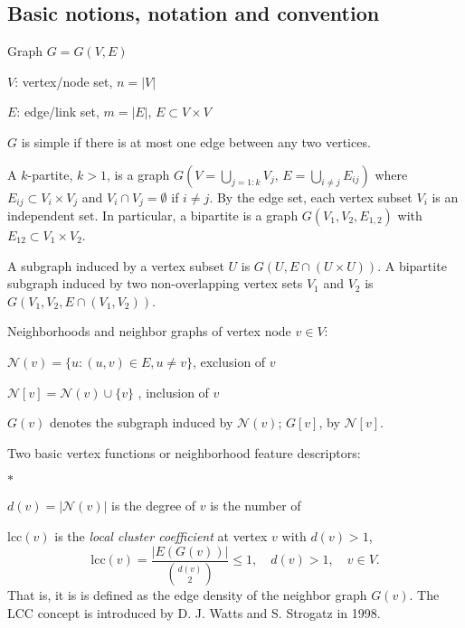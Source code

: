 %





\subsection*{Basic notions, notation and convention}

\noindent
Graph $G = G(V,E)$ 
\begin{list}{}{} 
\item $V$: vertex/node set, $n=|V|$ 
\item $E$: edge/link set, $m=|E|$, $E\subset V\times V$
\item $G$ is simple if there is at most one edge between any two
  vertices. 
\end{list}

\vspace{2em}

\noindent 
A $k$-partite, $k>1$, is a graph
$\displaystyle G\left(V=\bigcup_{j=1:k}V_j, \, E = \bigcup_{i\neq j}
  E_{ij} \right)$ where $E_{ij} \subset V_i\times V_j$ and
$V_i\cap V_j = \emptyset$ if $i\neq j$.  By the edge set, each vertex
subset $V_i$ is an independent set.  In particular, a bipartite is a
graph $G(V_1,V_2, E_{1,2})$ with $E_{12} \subset V_{1} \times V_{2}$.

\vspace{2em} 
\noindent 
A subgraph induced by a vertex subset $U$ is $G(U,E\cap (U\times U))$.
A bipartite subgraph induced by two non-overlapping vertex sets $V_1$
and $V_{2}$ is $G( V_1, V_2, E\cap (V_{1}, V_{2}))$.


\vspace{2em} 
\noindent
Neighborhoods and neighbor graphs of vertex node $v \in V$:
\begin{list}{}{}
\item $ \mathcal{N}(v) = \{u: (u,v) \in E, u\neq v  \}$, exclusion of $v$ 
\item $ \mathcal{N}[v] = \mathcal{N}(v) \cup \{v\} $ , inclusion of $v$
\item $G(v)$ denotes the subgraph induced by $\mathcal{N}(v)$; 
  $G[v]$, by $\mathcal{N}[v]$. 
\end{list}

\vspace{2em} 
\noindent
Two basic vertex functions or neighborhood feature descriptors:
\begin{list}{$\ast$}{} 
\item $d(v) = |\mathcal{N}(v)|$ is the degree of $v$ is the number of
\item $\text{lcc}(v)$ is the {\em local cluster coefficient} at vertex
  $v$ with $d(v)>1$, 
  \begin{equation} 
  \label{eq:local-cluster-coef}
  \text{lcc}(v)
  = \frac{ |E ( G(v) ) |  }{  { d(v) \choose  2 }   } \leq 1,
  \quad
  d(v) > 1,
  \quad v \in V.  
\end{equation}
That is, it is is defined as the edge density of the neighbor graph
$G(v)$. The LCC concept is introduced by D. J. Watts and S. Strogatz
in 1998.
\end{list}


